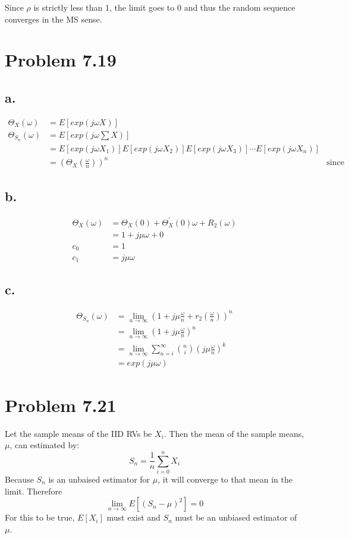 \documentclass[12pt]{article}
\newcommand{\infSum}{\lim_{n\to\infty} \sum_{n=i}^\infty}
\begin{document}
Since $\rho$ is strictly less than 1, the limit goes to 0 and thus the random sequence converges in the
MS sense. 

\section{Problem 7.19}
\subsection{a.}
\begin{align*}
  \Theta_{X}(\omega) &= E\left[ exp(j\omega X) \right] \\
  \Theta_{S_n}(\omega) &= E\left[ exp(j\omega\sum X) \right] \\
  &= E\left[ exp(j\omega X_1) \right]E\left[ exp(j\omega X_2) \right]E\left[ exp(j\omega X_3) \right] \cdots
  E\left[ exp(j\omega X_n) \right] \\
  &= \left(\Theta_X\left(\frac{\omega}{n}\right)\right)^n & \textrm{since X IID} 
\end{align*}

\subsection{b.}
\begin{align*}
  \Theta_X(\omega) &= \Theta_X(0) + \Theta_X^\prime(0)\omega + R_2(\omega) \\
   &= 1 + j\mu\omega + 0 \\
   c_0 &= 1 \\
   c_1 &= j\mu\omega
 \end{align*}

 \subsection{c.}
 \begin{align*}
   \Theta_{S_n}(\omega) &= \lim_{n\to\infty} \left( 1 + j\mu\frac{\omega}{n} + r_2\left( \frac{\omega}{n} \right) \right)^n \\
   &= \lim_{n\to\infty} \left( 1 + j\mu\frac{\omega}{n} \right)^n \\
   &= \infSum \binom{n}{i} \left( j\mu\frac{\omega}{n} \right)^k \\
   &= exp(j\mu\omega)
 \end{align*}

\section{Problem 7.21}
Let the sample means of the IID RVs be $X_i$. Then the mean of the sample means, $\mu$, can estimated by:
\[S_n = \frac{1}{n}\sum_{i=0}^n X_i\]
Because $S_n$ is an unbaised estimator for $\mu$, it will converge to that mean in the limit. Therefore
\[\lim_{n\to\infty}E\left[ \left( S_n - \mu \right)^2 \right] = 0\]
For this to be true, $E[X_i]$ must exist and $S_n$ must be an unbiased estimator of $\mu$. 
\end{document}
